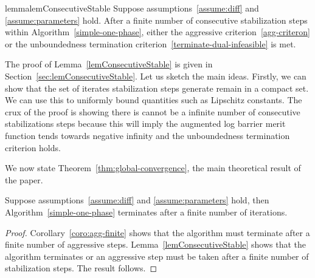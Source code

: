 \documentclass{article}
\begin{document}

\begin{restatable}{lemma}{lemConsecutiveStable}\label{lemConsecutiveStable}
Suppose assumptions~\ref{assume:diff} and \ref{assume:parameters} hold. 
After a finite number of consecutive stabilization steps within Algorithm~\ref{simple-one-phase}, either the aggressive criterion~\eqref{agg-criteron} or the unboundedness termination criterion~\eqref{terminate-dual-infeasible} is met.
\end{restatable}

The proof of Lemma~\ref{lemConsecutiveStable} is given in Section~\ref{sec:lemConsecutiveStable}. Let us sketch the main ideas. Firstly, we can show that the set of iterates stabilization steps generate remain in a compact set. We can use this to uniformly bound quantities such as Lipschitz constants. The crux of the proof is showing there is cannot be a infinite number of consecutive stabilizations steps because this will imply the augmented log barrier merit function tends towards negative infinity and the unboundedness termination criterion holds.

We now state Theorem~\ref{thm:global-convergence}, the main theoretical result of the paper.

\begin{theorem}\label{thm:global-convergence}
Suppose assumptions~\ref{assume:diff} and \ref{assume:parameters} hold, then Algorithm~\ref{simple-one-phase} terminates after a finite number of iterations.
\end{theorem}

\begin{proof}
Corollary~\ref{coro:agg-finite} shows that the algorithm must terminate after a finite number of aggressive steps. Lemma~\ref{lemConsecutiveStable} shows that the algorithm terminates or an aggressive step must be taken after a finite number of stabilization steps. The result follows.
\end{proof}


\end{document}
